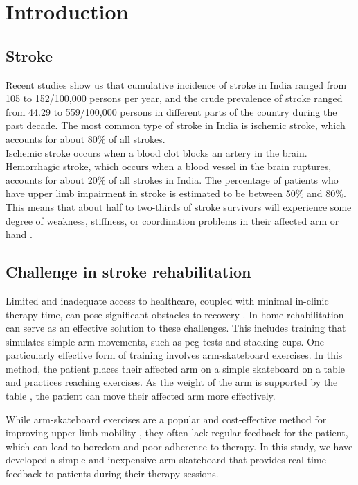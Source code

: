\documentclass[12pt, twoside]{report}
\begin{document}
\chapter{Introduction}
\section{Stroke}
Recent studies show us that cumulative incidence of stroke in India ranged from 105 to 152/100,000 persons per year, and the crude prevalence of stroke ranged from 44.29 to 559/100,000 persons in different parts of the country during the past decade. 
\parencite{kamalakannan_incidence_nodate} The most common type of stroke in India is ischemic stroke, 
which accounts for about 80\% of all strokes. \\

Ischemic stroke occurs when a blood clot blocks an artery in the brain.
Hemorrhagic stroke, which occurs when a blood vessel in the brain ruptures, 
accounts for about 20\% 
of all strokes in India. 
The percentage of patients who have upper limb impairment in stroke is 
estimated to be between 50\% and 80\%. 
This means that about half to two-thirds of stroke survivors will experience 
some degree of weakness, stiffness, or coordination problems 
in their affected arm or hand \parencite{parker_loss_2009, kamalakannan_incidence_nodate}.\\

\section{Challenge in stroke rehabilitation}

Limited and inadequate access to healthcare, 
coupled with minimal in-clinic therapy time, can pose significant obstacles 
to recovery \parencite{housman_randomized_2009}. In-home rehabilitation can serve as an effective solution 
to these challenges. This includes training that simulates simple arm 
movements, such as peg tests and stacking cups. One particularly effective 
form of training involves arm-skateboard exercises. In this method, 
the patient places their affected arm on a simple skateboard on a table 
and practices reaching exercises. As the weight of the arm is supported 
by the table \parencite{housman_randomized_2009,conroy_effect_2011}, 
the patient can move their affected arm more effectively.


While arm-skateboard exercises are a popular and cost-effective method 
for improving upper-limb mobility \parencite{chanubol_randomized_2012,sanchez_automating_2006}, they often lack regular feedback 
for the patient, which can lead to boredom and poor adherence to therapy. 
In this study, we have developed a simple and inexpensive arm-skateboard
 that provides real-time feedback to patients during their therapy 
 sessions.
\end{document}
